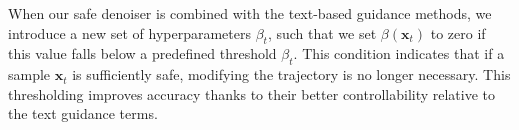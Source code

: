 When our safe denoiser is combined  with the text-based guidance methods, we introduce a new set of hyperparameters $\beta_{t}$, such that we set $\beta(\mathbf{x}_{t})$ to zero if this value falls below a predefined threshold $\beta_{t}$. This condition indicates that if a sample $\mathbf{x}_{t}$ is sufficiently safe, modifying the trajectory is no longer necessary. This thresholding improves accuracy thanks to their better controllability relative to the text guidance terms.

%
%
%
%





%

%
%
%
%
